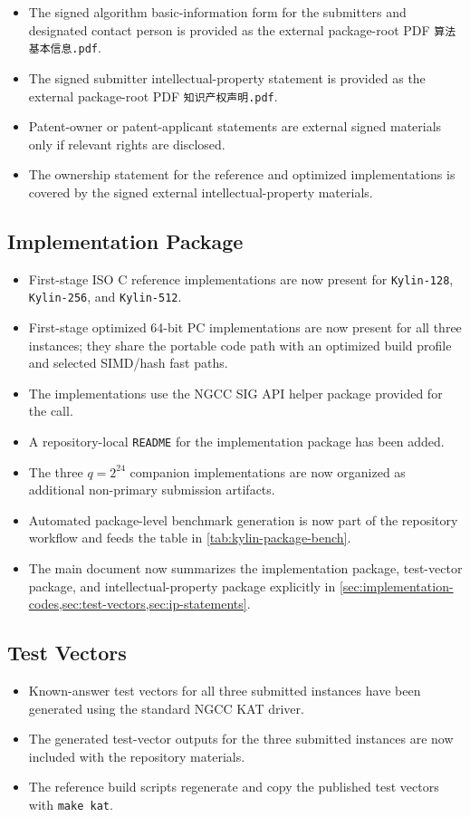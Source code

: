\begin{itemize}
    \item The signed algorithm basic-information form for the submitters and designated contact person is provided as the external package-root PDF \texttt{算法基本信息.pdf}.
    \item The signed submitter intellectual-property statement is provided as the external package-root PDF \texttt{知识产权声明.pdf}.
    \item Patent-owner or patent-applicant statements are external signed materials only if relevant rights are disclosed.
    \item The ownership statement for the reference and optimized implementations is covered by the signed external intellectual-property materials.
\end{itemize}

\subsection{Implementation Package}

\begin{itemize}
    \item First-stage ISO C reference implementations are now present for \texttt{Kylin-128}, \texttt{Kylin-256}, and \texttt{Kylin-512}.
    \item First-stage optimized 64-bit PC implementations are now present for all three instances; they share the portable code path with an optimized build profile and selected SIMD/hash fast paths.
    \item The implementations use the NGCC SIG API helper package provided for the call.
    \item A repository-local \texttt{README} for the implementation package has been added.
    \item The three $q=2^{24}$ companion implementations are now organized as additional non-primary submission artifacts.
    \item Automated package-level benchmark generation is now part of the repository workflow and feeds the table in \cref{tab:kylin-package-bench}.
    \item The main document now summarizes the implementation package, test-vector package, and intellectual-property package explicitly in \cref{sec:implementation-codes,sec:test-vectors,sec:ip-statements}.
\end{itemize}

\subsection{Test Vectors}

\begin{itemize}
    \item Known-answer test vectors for all three submitted instances have been generated using the standard NGCC KAT driver.
    \item The generated test-vector outputs for the three submitted instances are now included with the repository materials.
    \item The reference build scripts regenerate and copy the published test vectors with \texttt{make kat}.
\end{itemize}
